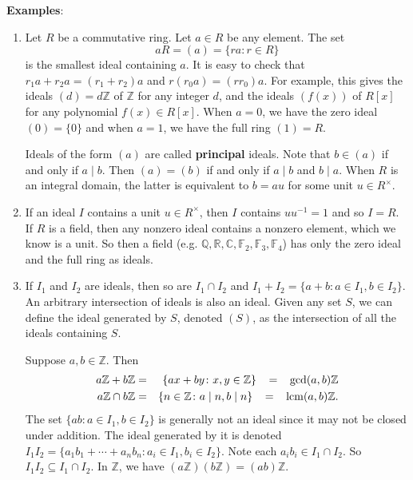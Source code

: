 \documentclass{article}
\def\Z{{\mathbb Z}}
\def\lcm{{\rm lcm}}
\def\R{{\mathbb R}}
\def\F{{\mathbb F}}
\def\Q{{\mathbb Q}}
\def\Z{{\mathbb Z}}
\def\F{{\mathbb F}}
\def\Q{{\mathbb Q}}
\def\C{{\mathbb C}}
\begin{document}
\vspace{5pt}
\noindent\textbf{Examples}:
\begin{enumerate}
    \item Let $R$ be a commutative ring. Let $a\in R$ be any element. The set
    $$aR = (a) = \{ra\colon r\in R\}$$
    is the smallest ideal containing $a$. It is easy to check that $r_1a + r_2a = (r_1+r_2)a$ and $r(r_0a) = (rr_0)a$. For example, this gives the ideals $(d) = d\Z$ of $\Z$ for any integer $d$, and the ideals $(f(x))$ of $R[x]$ for any polynomial $f(x)\in R[x]$. When $a = 0$, we have the zero ideal $(0) = \{0\}$ and when $a = 1$, we have the full ring $(1) = R$. %

    Ideals of the form $(a)$ are called \textbf{principal} ideals. Note that $b\in (a)$ if and only if $a\mid b$. Then $(a) = (b)$ if and only if $a\mid b$ and $b\mid a$. When $R$ is an integral domain, the latter is equivalent to $b = au$ for some unit $u\in R^\times$.
    \item If an ideal $I$ contains a unit $u\in R^\times$, then $I$ contains $uu^{-1} = 1$ and so $I = R$. If $R$ is a field, then any nonzero ideal contains a nonzero element, which we know is a unit. So then a field (e.g. $\Q,\R,\C,\F_2,\F_3,\F_4$) has only the zero ideal and the full ring as ideals.
    \item If $I_1$ and $I_2$ are ideals, then so are $I_1\cap I_2$ and $I_1 + I_2 = \{a + b\colon a\in I_1, b\in I_2\}$. An arbitrary intersection of ideals is also an ideal. Given any set $S$, we can define the ideal generated by $S$, denoted $(S)$, as the intersection of all the ideals containing $S$.

    Suppose $a,b\in\Z$. Then 
    \begin{eqnarray*}
        a\Z + b\Z &=& \{ax + by\colon x,y\in\Z\}\quad\! =\quad\! \gcd(a,b)\Z\\
        a\Z\cap b\Z &=& \{n\in\Z\colon a\mid n,b\mid n\}\quad\! =\quad \!\lcm(a,b)\Z.
    \end{eqnarray*}
    The set $\{ab\colon a\in I_1, b\in I_2\}$ is generally not an ideal since it may not be closed under addition. The ideal generated by it is denoted $I_1I_2 = \{a_1b_1 + \cdots + a_nb_n\colon a_i\in I_1, b_i\in I_2\}.$ Note each $a_ib_i\in I_1\cap I_2$. So $I_1I_2\subseteq I_1\cap I_2$. In $\Z$, we have $(a\Z)(b\Z) = (ab)\Z$.
\end{enumerate}
\end{document}
